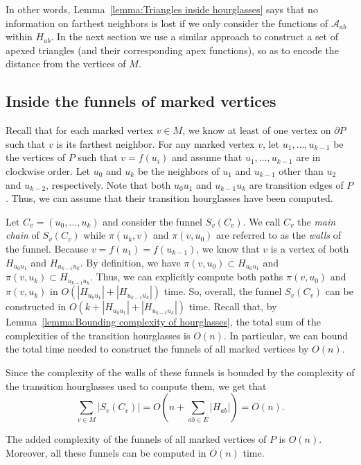 \documentclass[a4paper,UKenglish]{lipics}
\newcommand{\fn}[2]{\ensuremath{S_{\scriptscriptstyle #1}(#2)}}
\newcommand{\ff}[1]{\ensuremath{f(#1)}}
\newcommand{\p}[2]{\ensuremath{\pi(#1, #2)}}
\begin{document}
In other words, Lemma~\ref{lemma:Triangles inside hourglasses} says that no information on farthest neighbors is lost if we only consider the functions of $\mathcal A_{ab}$ within $H_{ab}$.  
In the next section we use a similar approach to construct a set of apexed triangles (and their corresponding apex functions), so as to encode the distance from the vertices of $M$.

\subsection{Inside the funnels of marked vertices}
Recall that for each marked vertex $v\in M$, we know at least of one vertex on $\partial P$ such that $v$ is its farthest neighbor.
For any marked vertex $v$, let $u_1, \ldots, u_{k-1}$ be the vertices of $P$ such that $v = \ff{u_i}$ and assume that $u_1, \ldots, u_{k-1}$ are in clockwise order. Let $u_0$ and $u_k$ be the neighbors of $u_1$ and $u_{k-1}$ other than $u_2$ and $u_{k-2}$, respectively. Note that both $u_0 u_1$ and $u_{k-1}u_k$ are transition edges of $P$. Thus, we can assume that their transition hourglasses have been computed.

Let $C_v = (u_0, \ldots, u_k)$ and consider the funnel $\fn{v}{C_v}$.
We call $C_v$ the \emph{main chain} of $\fn{v}{C_v}$ while $\p{u_k}{ v}$ and $\p{v}{ u_0}$ are referred to as the \emph{walls} of the funnel.  
Because $v = \ff{u_1} = \ff{u_{k-1}}$, we know that $v$ is a vertex of both $H_{u_0 u_1}$ and  $H_{u_{k-1}u_k}$. 
By definition, we have $\p{v}{ u_0}\subset H_{u_0u_1}$ and $\p{v}{u_k}\subset H_{u_{k-1}u_k}$. Thus, we can explicitly compute both paths $\p{v}{ u_0}$ and $\p{v}{u_k}$ in $O( |H_{u_0 u_1}| + |H_{u_{k-1}u_k}|)$ time.
So, overall, the funnel $\fn{v}{C_v}$ can be constructed in $O(k + |H_{u_0 u_1}| + |H_{u_{k-1}u_k}|)$ time. 
Recall that, by Lemma~\ref{lemma:Bounding complexity of hourglasses}, the total sum of the complexities of the transition hourglasses is $O(n)$. In particular, we can bound the total time needed to construct the funnels of all marked vertices by $O(n)$. 

Since the complexity of the walls of these funnels is bounded by the complexity of the transition hourglasses used to compute them, we get that $$\sum_{v\in M} |\fn{v}{C_v}|  = O\left(n + \sum_{ab\in E} |H_{ab}|\right) = O(n).$$

\begin{lemma}\label{lemma: Marked vertices funnels construction}
The added complexity of the funnels of all marked vertices of $P$ is $O(n)$. 
Moreover, all these funnels can be computed in $O(n)$ time.
\end{lemma}
\end{document}
